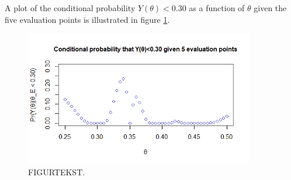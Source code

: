 A plot of the conditional probability $Y(\theta)<0.30$ as a function of $\theta$ given the five evaluation points is illustrated in figure \ref{2b}. 


\begin{figure}
    \centering
    \includegraphics[width=100mm]{2b.png}
    \caption{ FIGURTEKST. }
    \label{2b}
\end{figure}
